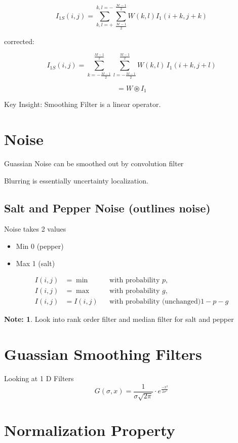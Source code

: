 \documentclass[11pt]{article}
\theoremstyle{definition}
\newtheorem*{myunnote}{Note:} %
\begin{document}
\[
I_{1S} (i, j) = \sum_{k,l=+}^{k,l=-}\sum_{\frac{\mathcal{M} - 1}{2}}^{\frac{\mathcal{M} - 1}{2}}W(k,l) I_1 (i+k, j+k)
\]

corrected:

\[
I_{1S}(i,j) = \sum_{k=-\frac{M-1}{2}}^{\frac{M-1}{2}}
\sum_{l=-\frac{M-1}{2}}^{\frac{M-1}{2}}
W(k,l)\, I_1(i+k, j+l)
\]

\[
= W \circledast I_1
\]





Key Insight:
Smoothing Filter is a linear operator.

\section{Noise}
Guassian Noise can be smoothed out by convolution filter

Blurring is essentially uncertainty localization.

\subsection{Salt and Pepper Noise (outlines noise)}

Noise takes 2 values

\begin{itemize}
    \item[-] Min 0 (pepper)
    \item[-] Max 1 (salt)
\end{itemize}



\begin{align}
I(i,j) &= \min && \text{with probability } p, \\
I(i,j) &= \max && \text{with probability } g, \\
I(i,j) &= I(i,j) && \text{with probability (unchanged)} 1-p-g
\end{align}

\begin{myunnote}
Look into rank order filter and median filter for salt and pepper
\end{myunnote}

\section{Guassian Smoothing Filters}
Looking at 1 D Filters
\[
G(\sigma, x) = \frac{1}{\sigma\sqrt{2\pi}} \cdot e^{\frac{-x^2}{2\sigma^2}}
\]

\section*{Normalization Property}
\end{document}
